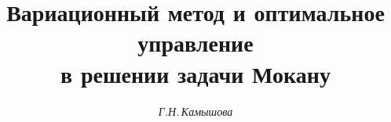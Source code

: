 





















\newcommand{\im}{\operatorname{Im}}


\newcommand{\re}{\operatorname{Re}}


\newcommand{\pde}[2]{\dfrac{\partial{#1}}{\partial{#2}}}


\newcommand{\tts}[1]{}










\setcounter{page}{35}












\author{\it Г.Н.\,Камышова}




\title{Вариационный метод и оптимальное управление \\


в решении задачи Мокану}





